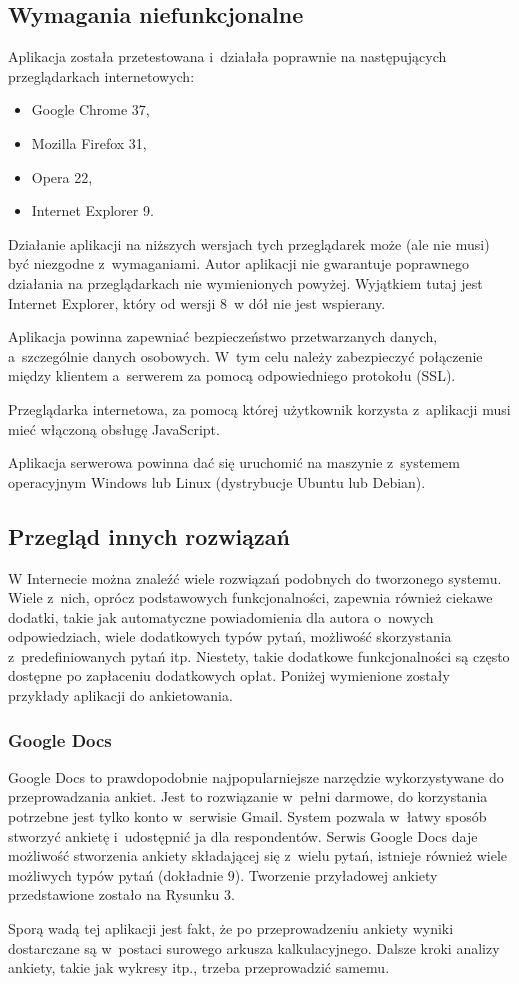 \documentclass[8pt,a4paper,notitlepage]{article}
\begin{document}
\subsection{Wymagania niefunkcjonalne}
Aplikacja została przetestowana i~działała poprawnie na następujących przeglądarkach internetowych:
\begin{itemize}
\item Google Chrome 37,
\item Mozilla Firefox 31,
\item Opera 22,
\item Internet Explorer 9.
\end{itemize}
Działanie aplikacji na niższych wersjach tych przeglądarek może (ale nie musi) być niezgodne z~wymaganiami. Autor aplikacji nie gwarantuje poprawnego działania na przeglądarkach nie wymienionych powyżej. Wyjątkiem tutaj jest Internet Explorer, który od wersji 8~w dół nie jest wspierany.
\par Aplikacja powinna zapewniać bezpieczeństwo przetwarzanych danych, a~szczególnie danych osobowych. W~tym celu należy zabezpieczyć połączenie między klientem a~serwerem za pomocą odpowiedniego protokołu (SSL).
\par Przeglądarka internetowa, za pomocą której użytkownik korzysta z~aplikacji musi mieć włączoną obsługę JavaScript.
\par Aplikacja serwerowa powinna dać się uruchomić na maszynie z~systemem operacyjnym Windows lub Linux (dystrybucje Ubuntu lub Debian).

\subsection{Przegląd innych rozwiązań}
W Internecie można znaleźć wiele rozwiązań podobnych do tworzonego systemu. Wiele z~nich, oprócz podstawowych funkcjonalności, zapewnia również ciekawe dodatki, takie jak automatyczne powiadomienia dla autora o~nowych odpowiedziach, wiele dodatkowych typów pytań, możliwość skorzystania z~predefiniowanych pytań itp. Niestety, takie dodatkowe funkcjonalności są często dostępne po zapłaceniu dodatkowych opłat. Poniżej wymienione zostały przykłady aplikacji do ankietowania.

\subsubsection{Google Docs}
Google Docs to prawdopodobnie najpopularniejsze narzędzie wykorzystywane do przeprowadzania ankiet. Jest to rozwiązanie w~pełni darmowe, do korzystania potrzebne jest tylko konto w~serwisie Gmail. System pozwala w~łatwy sposób stworzyć ankietę i~udostępnić ja dla respondentów. Serwis Google Docs daje możliwość stworzenia ankiety składającej się z~wielu pytań, istnieje również wiele możliwych typów pytań (dokładnie 9). Tworzenie przyładowej ankiety przedstawione zostało na Rysunku 3.
\par Sporą wadą tej aplikacji jest fakt, że po przeprowadzeniu ankiety wyniki dostarczane są w~postaci surowego arkusza kalkulacyjnego. Dalsze kroki analizy ankiety, takie jak wykresy itp., trzeba przeprowadzić samemu.
\end{document}
